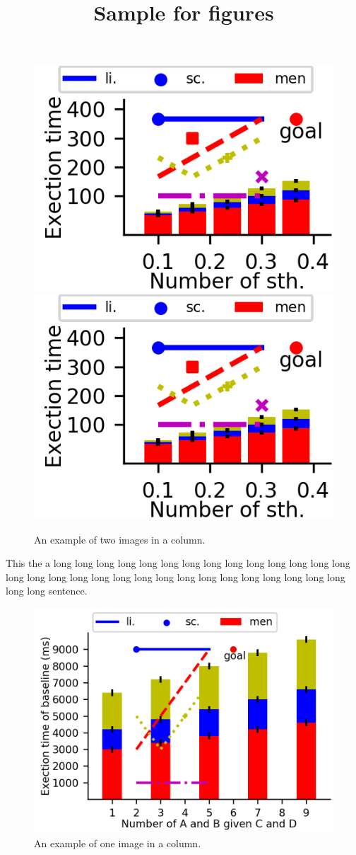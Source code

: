 \documentclass[letterpaper,twocolumn,10pt]{article}
\begin{document}
\title{\Large \bf Sample for figures}
\author{}
\date{}  %
\maketitle

\begin{figure}[h]
    \centering
    \includegraphics[width=0.48\linewidth]{SampleFig-1-6-inch.png}
    \includegraphics[width=0.48\linewidth]{SampleFig-1-6-inch.png}
    \caption{An example of two images in a column.}
\end{figure}

This the a long long long long long long long long long long long
 long long long long long long long long long long long long long
 long long long long long long long long sentence.

\begin{figure}[h]
    \centering
    \includegraphics[width=0.96\linewidth]{SampleFig-3-2-inch.png}
    \caption{An example of one image in a column.}
\end{figure}
\end{document}
